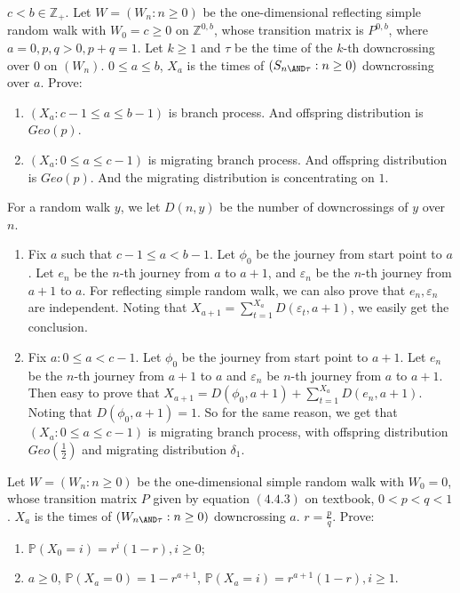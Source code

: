 \documentclass{ctexart}
\begin{document}
\begin{problem}\label{pro:2}
  \(c < b \in \mathbb{Z}_+\). Let \(W=(W_n :n \geq 0)\) be the one-dimensional reflecting simple
  random walk with \(W_0=c \geq 0\) on \(\mathbb{Z}^{0,b}\), whose transition matrix is \(P^{0,b}\), where
  \(a = 0,p,q >0, p + q =1\).
  Let \(k \geq 1\) and \(\tau\) be the time of the \(k\)-th downcrossing over \(0\) on \((W_n)\).
  \(0 \leq a \leq b\),
  \(X_a\) is the times of \((S_{n \AND \tau}:n \geq 0)\) downcrossing over \(a\). Prove:
  \begin{enumerate}
    \item \((X_a:c-1 \leq a \leq b-1)\) is branch process.
      And offspring distribution is \(Geo(p)\).
    \item \((X_a:0 \leq a \leq c-1)\) is migrating branch process.
      And offspring distribution is \(Geo(p)\).
      And the migrating distribution is concentrating on \(1\).
  \end{enumerate}
\end{problem}
\begin{solution}
  For a random walk \(y\), we let \(D(n,y)\) be the number of downcrossings of \(y\) over \(n\).
  \begin{enumerate}
    \item Fix \(a\) such that \(c-1 \leq a < b-1\).
      Let \(\phi_0\) be the journey from start point to \(a\).
      Let \(e_n\) be the \(n\)-th journey from \(a\) to \(a+1\), and \(\varepsilon_n\) be the \(n\)-th journey from \(a+1\) to \(a\).
      For reflecting simple random walk, we can also prove that \(e_n,\varepsilon_n\) are independent.
      Noting that \(X_{a+1}=\sum_{t=1}^{X_a} D(\varepsilon_t,a+1)\), we easily get the conclusion.
    \item Fix \(a:0 \leq a<c-1\). Let \(\phi_0\) be the journey from start point to \(a+1\).
      Let \(e_n\) be the \(n\)-th journey from \(a+1\) to \(a\) and \(\varepsilon_n\) be \(n\)-th journey from \(a\) to \(a+1\).
      Then easy to prove that \(X_{a+1}=D(\phi_0,a+1)+\sum_{t=1}^{X_a} D(e_n,a+1)\).
      Noting that \(D(\phi_0,a+1)=1\). So for the same reason, we get that \((X_a:0 \leq a \leq c-1)\) is migrating branch process,
      with offspring distribution \(Geo(\frac{1}{2})\) and migrating distribution \(\delta_1\).
  \end{enumerate}
\end{solution}
\begin{problem}\label{pro:3}
  Let \(W=(W_n:n \geq 0)\) be the one-dimensional simple random walk with \(W_0=0\),
  whose transition matrix \(P\) given by equation \((4.4.3)\)
  on textbook, \(0< p<q<1\).
  \(X_a\) is the times of \((W_{n \AND \tau}:n \geq 0)\) downcrossing \(a\).
  \(r=\frac{p}{q}\).
  Prove:
  \begin{enumerate}
    \item \label{ite:3.1} \(\mathbb{P}(X_0=i)=r^i(1-r),i \geq 0\);
    \item \(a \geq 0\), \(\mathbb{P}(X_a=0)=1-r^{a +1}\), \(\mathbb{P}(X_a=i)=r^{a + 1}(1 -r),i \geq 1\).
  \end{enumerate}
\end{problem}
\end{document}
